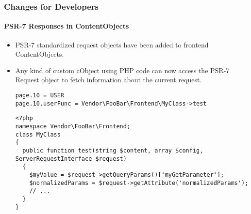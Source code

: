%

\begin{frame}[fragile]
	\frametitle{Changes for Developers}
	\framesubtitle{PSR-7 Responses in ContentObjects}

	\lstset{basicstyle=\tiny\ttfamily}

	\begin{itemize}
		\item PSR-7 standardized request objects have been added to frontend ContentObjects.
		\item Any kind of custom cObject using PHP code can now access the PSR-7
			Request object to fetch information about the current request.
\begin{lstlisting}
page.10 = USER
page.10.userFunc = Vendor\FooBar\Frontend\MyClass->test
\end{lstlisting}
\begin{lstlisting}
<?php
namespace Vendor\FooBar\Frontend;
class MyClass
{
  public function test(string $content, array $config, ServerRequestInterface $request)
  {
    $myValue = $request->getQueryParams()['myGetParameter'];
    $normalizedParams = $request->getAttribute('normalizedParams');
	// ...
  }
}
\end{lstlisting}

	\end{itemize}
\end{frame}

